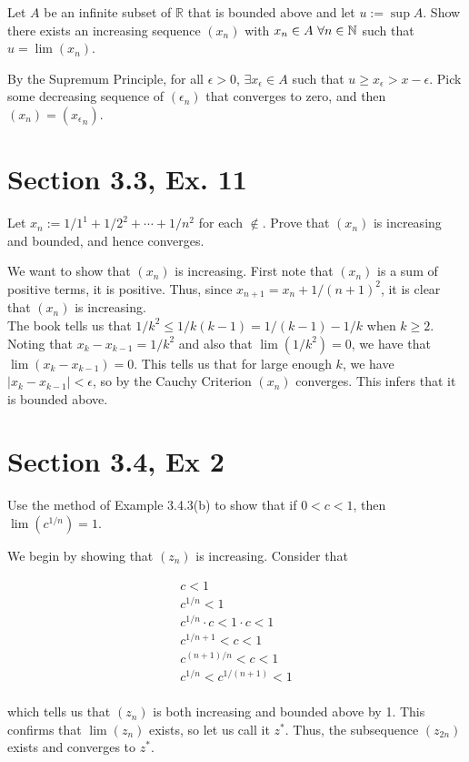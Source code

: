 \documentclass[paper=a4, fontsize=11pt]{scrartcl} %
\numberwithin{equation}{section} %
\numberwithin{figure}{section} %
\numberwithin{table}{section} %
\begin{document}
Let $A$ be an infinite subset of $\mathbb{R}$ that is bounded above and let $u := \sup A$. Show there exists an increasing sequence $(x_n)$ with $x_n \in A ~ \forall n \in \mathbb{N}$ such that $u = \lim(x_n)$.

\pf By the Supremum Principle, for all $\epsilon > 0$, $\exists x_\epsilon \in A$ such that $u \geq x_\epsilon > x - \epsilon$. Pick some decreasing sequence of $(\epsilon_n)$ that converges to zero, and then $(x_n) = ({x_\epsilon}_n)$. \done

\section*{Section 3.3, Ex. 11}

Let $x_n := 1/1^1 + 1/2^2 + \cdots + 1/n^2$ for each $\nin$. Prove that $(x_n)$ is increasing and bounded, and hence converges.

\pf We want to show that $(x_n)$ is increasing. First note that $(x_n)$ is a sum of positive terms, it is positive. Thus, since $x_{n+1} = x_n + 1/(n+1)^2$, it is clear that $(x_n)$ is increasing.\\

The book tells us that $1/k^2 \leq 1/k(k-1) = 1/(k-1) - 1/k$ when $k \geq 2$. Noting that $x_k - x_{k-1} = 1/k^2$ and also that $\lim(1/k^2) = 0$, we have that $\lim(x_k - x_{k-1}) = 0$. This tells us that for large enough $k$, we have $|x_k - x_{k-1}| < \epsilon$, so by the Cauchy Criterion $(x_n)$ converges. This infers that it is bounded above. \done

\section*{Section 3.4, Ex 2}

Use the method of Example 3.4.3(b) to show that if $0 < c < 1$, then $\lim(c^{1/n}) = 1$.

\pf We begin by showing that $(z_n)$ is increasing. Consider that

\begin{gather*}
c < 1\\
c^{1/n} < 1\\
c^{1/n} \cdot c < 1 \cdot c < 1\\
c^{1/n + 1} < c < 1\\
c^{(n + 1)/n} < c < 1\\
c^{1/n} < c^{1/(n+1)} < 1\\
\end{gather*}

which tells us that $(z_n)$ is both increasing and bounded above by 1. This confirms that $\lim(z_n)$ exists, so let us call it $z^*$. Thus, the subsequence $(z_{2n})$ exists and converges to $z^*$.\\
\end{document}
